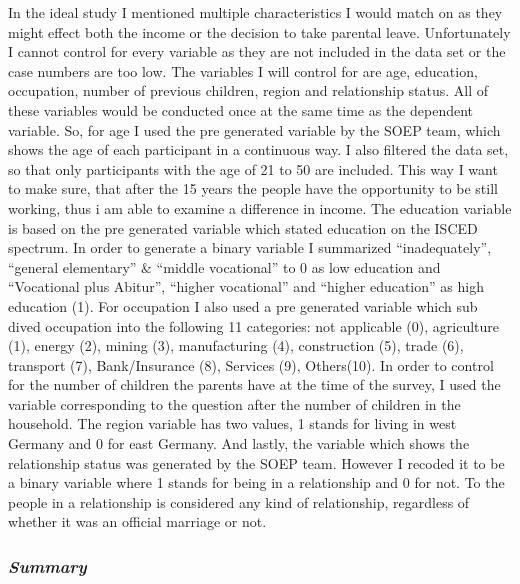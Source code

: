 \documentclass[
  12pt,
]{article}
\begin{document}
In the ideal study I mentioned multiple characteristics I would match on as they might effect both the income or the decision to take parental leave. Unfortunately I cannot control for every variable as they are not included in the data set or the case numbers are too low. The variables I will control for are age, education, occupation, number of previous children, region and relationship status. All of these variables would be conducted once at the same time as the dependent variable.
So, for age I used the pre generated variable by the SOEP team, which shows the age of each participant in a continuous way. I also filtered the data set, so that only participants with the age of 21 to 50 are included. This way I want to make sure, that after the 15 years the people have the opportunity to be still working, thus i am able to examine a difference in income.
The education variable is based on the pre generated variable which stated education on the ISCED spectrum. In order to generate a binary variable I summarized ``inadequately'', ``general elementary'' \& ``middle vocational'' to 0 as low education and ``Vocational plus Abitur'', ``higher vocational'' and ``higher education'' as high education (1).
For occupation I also used a pre generated variable which sub dived occupation into the following 11 categories: not applicable (0), agriculture (1), energy (2), mining (3), manufacturing (4), construction (5), trade (6), transport (7), Bank/Insurance (8), Services (9), Others(10).
In order to control for the number of children the parents have at the time of the survey, I used the variable corresponding to the question after the number of children in the household.
The region variable has two values, 1 stands for living in west Germany and 0 for east Germany.
And lastly, the variable which shows the relationship status was generated by the SOEP team. However I recoded it to be a binary variable where 1 stands for being in a relationship and 0 for not. To the people in a relationship is considered any kind of relationship, regardless of whether it was an official marriage or not.

\hypertarget{summary}{%
\subsubsection*{\texorpdfstring{\emph{Summary}}{Summary}}\label{summary}}
\end{document}

